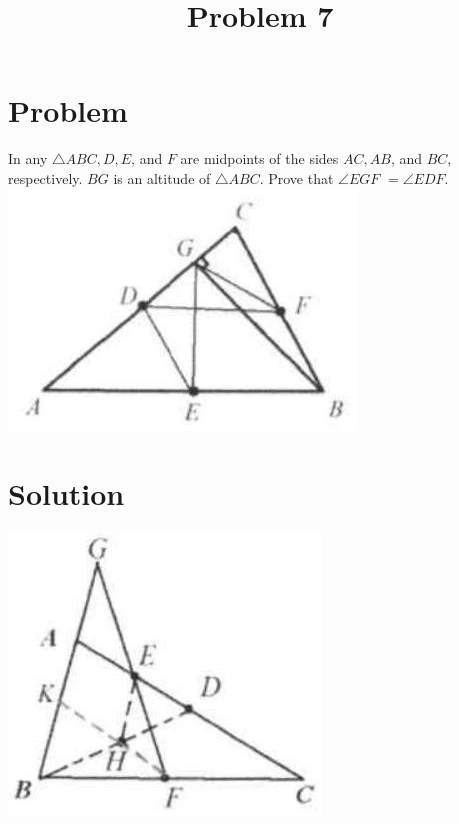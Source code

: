 \documentclass{article}
\title{Problem 7}
\date{}
\begin{document}
\maketitle

\section*{Problem}
In any \(\triangle A B C, D, E\), and \(F\) are midpoints of the sides \(A C, A B\), and \(B C\), respectively. \(B G\) is an altitude of \(\triangle A B C\). Prove that \(\angle E G F\) \(=\angle E D F\).\\
\centering
\includegraphics[width=\textwidth]{images/045.jpg}

\section*{Solution}
\begin{center}
\includegraphics[width=\textwidth]{images/050.jpg}
\end{center}
\end{document}
